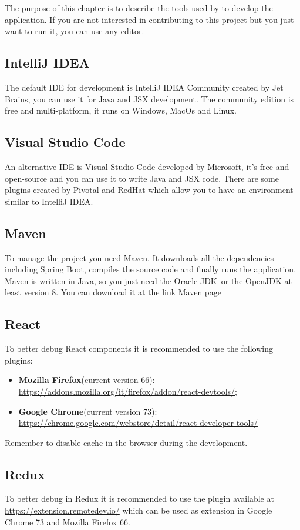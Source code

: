 The purpose of this chapter is to describe the tools used by \gruppo{} to develop the application.
If you are not interested in contributing to this project but you just want to run it, you can use any editor.
\subsection{IntelliJ IDEA}
The default IDE for development is IntelliJ IDEA Community created by Jet Brains, you can use it for Java and JSX development. The community edition is free and multi-platform, it runs on Windows, MacOs and Linux.

\subsection{Visual Studio Code}
An alternative IDE is Visual Studio Code developed by Microsoft, it's free and open-source and you can use it to write Java and JSX code. There are some plugins created by Pivotal and RedHat which allow you to have an environment similar to IntelliJ IDEA.

\subsection{Maven}
To manage the project you need Maven. It downloads all the dependencies including Spring Boot, compiles the source code and finally runs the application. Maven is written in Java, so you just need the {Oracle JDK}\ or the OpenJDK at least version 8.
You can download it at the link \href{https://maven.apache.org/}{Maven page}

\subsection{React}
To better debug React components it is recommended to use the following plugins:
\begin{itemize}
\item \textbf{Mozilla Firefox}(current version 66): \\
\url{https://addons.mozilla.org/it/firefox/addon/react-devtools/};
\item \textbf{Google Chrome}(current version 73): \\
\href{https://chrome.google.com/webstore/detail/react-developer-tools/fmkadmapgofadopljbjfkapdkoienihi}{https://chrome.google.com/webstore/detail/react-developer-tools/}
\end{itemize}
Remember to disable cache in the browser during the development.

\subsection{Redux}
To better debug in Redux it is recommended to use the plugin available at\\ \url{https://extension.remotedev.io/} which can be used as extension in Google Chrome 73 and Mozilla Firefox 66.

 
